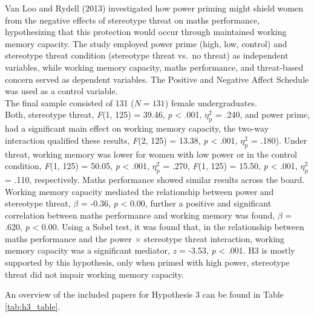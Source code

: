 \documentclass[
  stu, a4paper, 12pt,mask,floatsintext]{apa7}
\begin{document}
Van Loo and Rydell (2013) investigated how power priming might shield women from the negative effects of stereotype threat on maths performance, hypothesizing that this protection would occur through maintained working memory capacity.
The study employed power prime (high, low, control) and stereotype threat condition (stereotype threat vs.~no threat) as independent variables, while working memory capacity, maths performance, and threat-based concern served as dependent variables.
The Positive and Negative Affect Schedule was used as a control variable.\\
The final sample consisted of 131 (\(N = 131\)) female undergraduates.\\
Both, stereotype threat, \emph{F}(1, 125) = 39.46, \emph{p} \textless{} .001, \(\eta^{2}_{\text{p}}\) = .240, and power prime, had a significant main effect on working memory capacity, the two-way interaction qualified these results, \emph{F}(2, 125) = 13.38, \emph{p} \textless{} .001, \(\eta^{2}_{\text{p}}\) = .180).
Under threat, working memory was lower for women with low power or in the control condition, \emph{F}(1, 125) = 50.05, \emph{p} \textless{} .001, \(\eta^{2}_{\text{p}}\) = .270, \emph{F}(1, 125) = 15.50, \emph{p} \textless{} .001, \(\eta^{2}_{\text{p}}\) = .110, respectively.
Maths performance showed similar results across the board.
Working memory capacity mediated the relationship between power and stereotype threat, \(\beta\) = -0.36, \emph{p} \textless{} 0.00, further a positive and significant correlation between maths performance and working memory was found, \(\beta\) = .620, \emph{p} \textless{} 0.00.
Using a Sobel test, it was found that, in the relationship between maths performance and the power \(\times\) stereotype threat interaction, working memory capacity was a significant mediator, \emph{z} = -3.53, \emph{p} \textless{} .001.
H3 is mostly supported by this hypothesis, only when primed with high power, stereotype threat did not impair working memory capacity.

An overview of the included papers for Hypothesis 3 can be found in Table \ref{tab:h3_table}.
\end{document}
